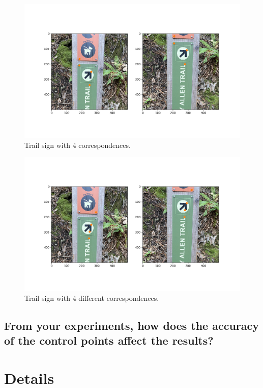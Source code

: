 \documentclass[]{article}
\begin{document}
		\begin{figure}[H]
			\centering
			\includegraphics[width=6.5in]{test_images/sign_4_correspondences.png}
			\caption{Trail sign with 4 correspondences.}
		\end{figure}
		
		\begin{figure}[H]
			\centering
			\includegraphics[width=6.5in]{test_images/sign_4_1_correspondences.png}
			\caption{Trail sign with 4 different correspondences.}
		\end{figure}
		
	\subsection{From your experiments, how does the accuracy of the control points affect the results?}

\section{Details}
\end{document}
